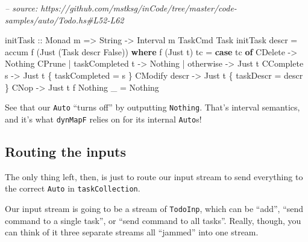 \documentclass[]{article}
\newenvironment{Shaded}{}{}
\newcommand{\CommentTok}[1]{\textcolor[rgb]{0.38,0.63,0.69}{\textit{#1}}}
\newcommand{\DataTypeTok}[1]{\textcolor[rgb]{0.56,0.13,0.00}{#1}}
\newcommand{\FunctionTok}[1]{\textcolor[rgb]{0.02,0.16,0.49}{#1}}
\newcommand{\KeywordTok}[1]{\textcolor[rgb]{0.00,0.44,0.13}{\textbf{#1}}}
\newcommand{\NormalTok}[1]{#1}
\newcommand{\OtherTok}[1]{\textcolor[rgb]{0.00,0.44,0.13}{#1}}
\begin{document}
\begin{Shaded}
\begin{Highlighting}[]
\CommentTok{-- source: https://github.com/mstksg/inCode/tree/master/code-samples/auto/Todo.hs#L52-L62}

\OtherTok{initTask ::} \DataTypeTok{Monad}\NormalTok{ m }\OtherTok{=>} \DataTypeTok{String} \OtherTok{->} \DataTypeTok{Interval}\NormalTok{ m }\DataTypeTok{TaskCmd} \DataTypeTok{Task}
\NormalTok{initTask descr }\FunctionTok{=}\NormalTok{ accum f (}\DataTypeTok{Just}\NormalTok{ (}\DataTypeTok{Task}\NormalTok{ descr }\DataTypeTok{False}\NormalTok{))}
  \KeywordTok{where}
\NormalTok{    f (}\DataTypeTok{Just}\NormalTok{ t) tc }\FunctionTok{=} \KeywordTok{case}\NormalTok{ tc }\KeywordTok{of}
                      \DataTypeTok{CDelete}                  \OtherTok{->} \DataTypeTok{Nothing}
                      \DataTypeTok{CPrune} \FunctionTok{|}\NormalTok{ taskCompleted t }\OtherTok{->} \DataTypeTok{Nothing}
                             \FunctionTok{|}\NormalTok{ otherwise       }\OtherTok{->} \DataTypeTok{Just}\NormalTok{ t}
                      \DataTypeTok{CComplete}\NormalTok{ s              }\OtherTok{->} \DataTypeTok{Just}\NormalTok{ t \{ taskCompleted }\FunctionTok{=}\NormalTok{ s \}}
                      \DataTypeTok{CModify}\NormalTok{ descr            }\OtherTok{->} \DataTypeTok{Just}\NormalTok{ t \{ taskDescr }\FunctionTok{=}\NormalTok{ descr \}}
                      \DataTypeTok{CNop}                     \OtherTok{->} \DataTypeTok{Just}\NormalTok{ t}
\NormalTok{    f }\DataTypeTok{Nothing}\NormalTok{ _   }\FunctionTok{=} \DataTypeTok{Nothing}
\end{Highlighting}
\end{Shaded}

See that our \texttt{Auto} ``turns off'' by outputting \texttt{Nothing}. That's
interval semantics, and it's what \texttt{dynMapF} relies on for its internal
\texttt{Auto}s!

\hypertarget{routing-the-inputs}{%
\subsection{Routing the inputs}\label{routing-the-inputs}}

The only thing left, then, is just to route our input stream to send everything
to the correct \texttt{Auto} in \texttt{taskCollection}.

Our input stream is going to be a stream of \texttt{TodoInp}, which can be
``add'', ``send command to a single task'', or ``send command to all tasks''.
Really, though, you can think of it three separate streams all ``jammed'' into
one stream.
\end{document}
